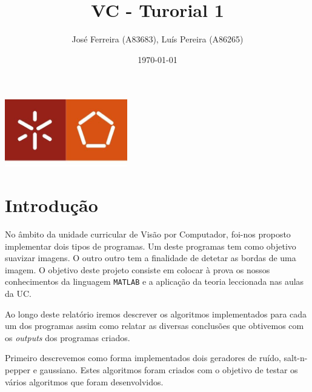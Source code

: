 \documentclass[a4paper]{report}
\begin{document}
\title{VC - Turorial 1}
\author{José Ferreira (A83683), Luís Pereira (A86265)}
\date{\today}

\begin{center}
    \begin{minipage}{0.75\linewidth}
        \centering
        \includegraphics[width=0.4\textwidth]{images/eng.jpeg}\par\vspace{1cm}
        \vspace{1.5cm}
        \href{https://www.uminho.pt/PT}
        {\color{black}{\scshape\LARGE Universidade do Minho}} \par
        \vspace{1cm}
        \href{https://www.di.uminho.pt/}
        {\color{black}{\scshape\Large Departamento de Informática}} \par
        \vspace{1.5cm}
        \maketitle
    \end{minipage}
\end{center}

\tableofcontents

\pagebreak
\chapter{Introdução}
No âmbito da unidade curricular de Visão por Computador, foi-nos proposto implementar dois tipos de programas.
Um deste programas tem como objetivo suavizar imagens. O outro outro tem a finalidade de detetar as bordas de uma imagem.
O objetivo deste projeto consiste em colocar à prova os nossos conhecimentos da linguagem \texttt{MATLAB} e a aplicação da teoria leccionada nas aulas da UC.

Ao longo deste relatório iremos descrever os algoritmos implementados para cada um dos programas assim como relatar as
diversas conclusões que obtivemos com os \textit{outputs} dos programas criados.

Primeiro descrevemos como forma implementados dois geradores de ruído, salt-n-pepper e gaussiano. Estes algoritmos foram criados com o objetivo de testar os vários algoritmos que foram desenvolvidos.
\end{document}
